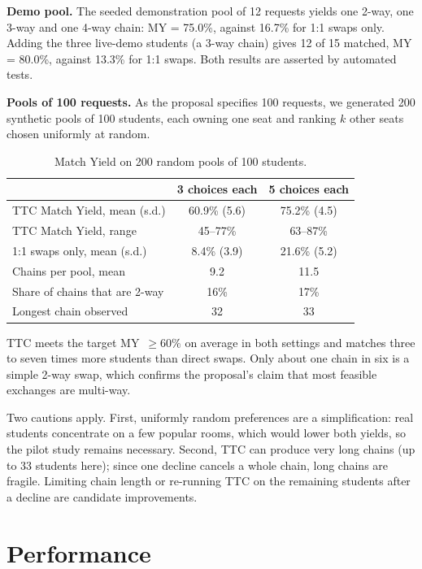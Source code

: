 \documentclass{tietreport}
\begin{document}
\textbf{Demo pool.} The seeded demonstration pool of 12 requests
yields one 2-way, one 3-way and one 4-way chain: MY = 75.0\%, against
16.7\% for 1:1 swaps only. Adding the three live-demo students (a
3-way chain) gives 12 of 15 matched, MY = 80.0\%, against 13.3\% for
1:1 swaps. Both results are asserted by automated tests.

\textbf{Pools of 100 requests.} As the proposal specifies 100 requests,
we generated 200 synthetic pools of 100 students, each owning one seat
and ranking $k$ other seats chosen uniformly at random.

\begin{table}[H]
\centering
\begin{tabular}{@{}lcc@{}}
\toprule
 & \textbf{3 choices each} & \textbf{5 choices each} \\
\midrule
TTC Match Yield, mean (s.d.) & 60.9\% (5.6) & 75.2\% (4.5) \\
TTC Match Yield, range & 45--77\% & 63--87\% \\
1:1 swaps only, mean (s.d.) & 8.4\% (3.9) & 21.6\% (5.2) \\
Chains per pool, mean & 9.2 & 11.5 \\
Share of chains that are 2-way & 16\% & 17\% \\
Longest chain observed & 32 & 33 \\
\bottomrule
\end{tabular}
\caption{Match Yield on 200 random pools of 100 students.}
\label{tab:yield}
\end{table}

TTC meets the target MY~$\geq 60\%$ on average in both settings and
matches three to seven times more students than direct swaps. Only
about one chain in six is a simple 2-way swap, which confirms the
proposal's claim that most feasible exchanges are multi-way.

Two cautions apply. First, uniformly random preferences are a
simplification: real students concentrate on a few popular rooms,
which would lower both yields, so the pilot study remains necessary.
Second, TTC can produce very long chains (up to 33 students here); since
one decline cancels a whole chain, long chains are fragile. Limiting
chain length or re-running TTC on the remaining students after a
decline are candidate improvements.

\section{Performance}
\end{document}
